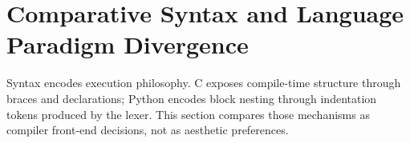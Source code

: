 \section{Comparative Syntax and Language Paradigm Divergence}

Syntax encodes execution philosophy. C exposes compile-time structure through braces and declarations; Python encodes block nesting through indentation tokens produced by the lexer. This section compares those mechanisms as compiler front-end decisions, not as aesthetic preferences.
